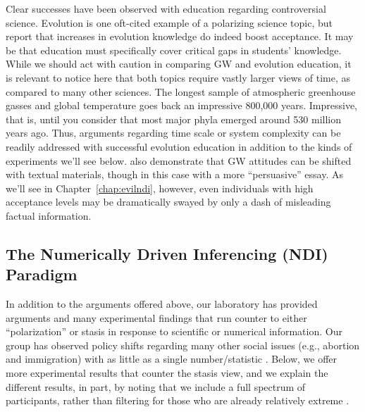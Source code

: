 Clear successes have been observed with education regarding controversial science.
Evolution is one oft-cited example of a polarizing science topic, but
\textcite{shtulman_learning_2008} report that increases in evolution knowledge
do indeed boost acceptance. It may be that education must specifically
cover critical gaps in students' knowledge. While we should act with caution in
comparing GW and evolution education, it is relevant to notice here that both
topics require
vastly larger views of time, as compared to many other sciences. The longest
sample of atmospheric greenhouse gasses and global temperature goes back an
impressive 800,000 years.  Impressive, that is, until you consider that most
major phyla emerged around 530 million years ago. Thus, arguments regarding time
scale or system complexity can be readily addressed with successful
evolution education in addition to the kinds of experiments we'll see below.
\textcite{sinatra_promoting_2012} also demonstrate that GW attitudes can be shifted
with textual materials, though in this case with a more “persuasive” essay. As
we'll see in Chapter~\ref{chap:evilndi}, however, even individuals with high
acceptance levels may be dramatically swayed by only a dash of misleading
factual information. 

\subsection{The Numerically Driven Inferencing (NDI) Paradigm}
\label{sec:ndi}


In addition to the arguments offered above, our laboratory has provided
arguments and many experimental findings that run counter to either ``polarization'' or
stasis in response to scientific or numerical information.  Our group has observed
policy shifts regarding many other social issues (e.g., abortion and
immigration) with as little as a single number/statistic
\parencite{garcia_de_osuna_qualitative_2004,munnich_policy_2003,ranney_designing_2008}.
Below, we offer more experimental results that counter the stasis view, and we
explain the different results, in part, by noting that we include a full
spectrum of participants, rather than filtering for those who are already
relatively extreme \parencite[cf.][]{lord_biased_1979}.


